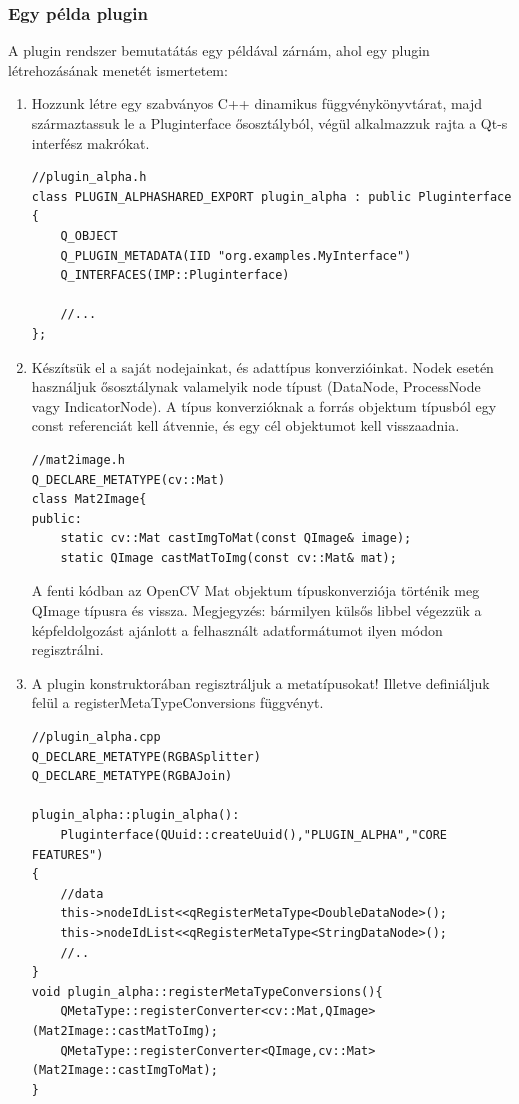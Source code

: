 \documentclass[a4paper,12pt,oneside]{report}
\begin{document}
\subsubsection{Egy példa plugin}
A plugin rendszer bemutatátás egy példával zárnám, ahol egy plugin létrehozásának menetét ismertetem:
\begin{enumerate}
\itemsep0em
\item Hozzunk létre egy szabványos C++ dinamikus függvénykönyvtárat, majd származtassuk le a Pluginterface ősosztályból, végül alkalmazzuk rajta a Qt-s interfész makrókat.
\begin{lstlisting}
//plugin_alpha.h
class PLUGIN_ALPHASHARED_EXPORT plugin_alpha : public Pluginterface
{
    Q_OBJECT
    Q_PLUGIN_METADATA(IID "org.examples.MyInterface")
    Q_INTERFACES(IMP::Pluginterface)

    //...
};
\end{lstlisting}
\item Készítsük el a saját nodejainkat, és adattípus konverzióinkat. Nodek esetén használjuk ősosztálynak valamelyik node típust (DataNode, ProcessNode vagy IndicatorNode). A típus konverzióknak a forrás objektum típusból egy const referenciát kell átvennie, és egy cél objektumot kell visszaadnia.
\begin{lstlisting}
//mat2image.h
Q_DECLARE_METATYPE(cv::Mat)
class Mat2Image{
public:
    static cv::Mat castImgToMat(const QImage& image);
    static QImage castMatToImg(const cv::Mat& mat);
\end{lstlisting}
A fenti kódban az OpenCV Mat objektum típuskonverziója történik meg QImage típusra és vissza. Megjegyzés: bármilyen külsős libbel végezzük a képfeldolgozást ajánlott a felhasznált adatformátumot ilyen módon regisztrálni.

\item A plugin konstruktorában regisztráljuk a metatípusokat! Illetve definiáljuk felül a registerMetaTypeConversions függvényt.
\begin{lstlisting}
//plugin_alpha.cpp
Q_DECLARE_METATYPE(RGBASplitter)
Q_DECLARE_METATYPE(RGBAJoin)

plugin_alpha::plugin_alpha():
    Pluginterface(QUuid::createUuid(),"PLUGIN_ALPHA","CORE FEATURES")
{
    //data
    this->nodeIdList<<qRegisterMetaType<DoubleDataNode>();
    this->nodeIdList<<qRegisterMetaType<StringDataNode>();
    //..
}
void plugin_alpha::registerMetaTypeConversions(){
    QMetaType::registerConverter<cv::Mat,QImage>(Mat2Image::castMatToImg);
    QMetaType::registerConverter<QImage,cv::Mat>(Mat2Image::castImgToMat);
}

\end{lstlisting}
\end{enumerate}
\end{document}
